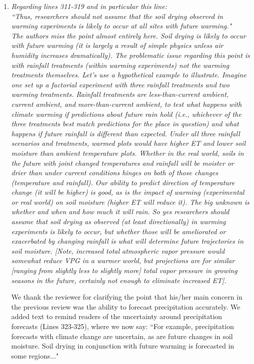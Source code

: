 \documentclass[11pt,a4paper]{letter}
\begin{document}
\begin{letter}{}
\begin{enumerate}
\begin{enumerate}
\item \emph{Regarding lines 311-319 and in particular this line:\\
``Thus, researchers should not assume that the soil drying observed in warming experiments is likely to occur
at all sites with future warming."}
\\
\emph{The authors miss the point almost entirely here. Soil drying is likely to occur
with future warming (it is largely a result of simple physics unless air humidity
increases dramatically). The problematic issue regarding this point is with
rainfall treatments (within warming experiments) not the warming treatments
themselves. Let's use a hypothetical example to illustrate. Imagine one set up
a factorial experiment with three rainfall treatments and two warming
treatments. Rainfall treatments are less-than-current ambient, current
ambient, and more-than-current ambient, to test what happens with climate
warming if predictions about future rain hold (i.e., whichever of the three
treatments best match predictions for the place in question) and what
happens if future rainfall is different than expected. Under all three rainfall
scenarios and treatments, warmed plots would have higher ET and lower soil
moisture than ambient temperature plots. Whether in the real world, soils in
the future with joint changed temperatures and rainfall will be moister or drier
than under current conditions hinges on both of those changes (temperature
and rainfall). Our ability to predict direction of temperature change (it will be
higher) is good, as is the impact of warming (experimental or real world) on
soil moisture (higher ET will reduce it). The big unknown is whether and when
and how much it will rain. So yes researchers should assume that soil drying
as observed (at least directionally) in warming experiments is likely to occur,
but whether those will be ameliorated or exacerbated by changing rainfall is
what will determine future trajectories in soil moisture. [Note, increased total
atmospheric vapor pressure would somewhat reduce VPG in a warmer world,
but projections are for similar [ranging from slightly less to slightly more] total
vapor pressure in growing seasons in the future, certainly not enough to
eliminate increased ET].}\\

\par We thank the reviewer for clarifying the point that his/her main concern in the previous review was the ability to forecast precipitation accurately. We added text to remind readers of the uncertainty around precipitation forecasts (Lines 323-325), where we now say: ``For example, precipitation forecasts with climate change are uncertain, as are future changes in soil moisture. Soil drying in conjunction with future warming is forecasted in some regions..."\\


\end{enumerate}
\end{enumerate}
\end{letter}
\end{document}

